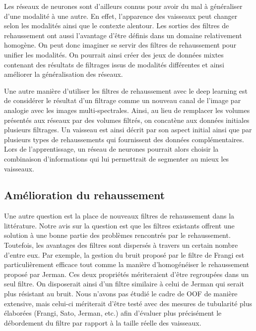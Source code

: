 Les réseaux de neurones sont d'ailleurs connus pour avoir du mal à généraliser d'une modalité à une autre. En effet, l'apparence des vaisseaux peut changer selon les modalités ainsi que le contexte alentour. Les sorties des filtres de rehaussement ont aussi l'avantage d'être définis dans un domaine relativement homogène. On peut donc imaginer se servir des filtres de rehaussement pour unifier les modalités. On pourrait ainsi créer des jeux de données mixtes contenant des résultats de filtrages issus de modalités différentes et ainsi améliorer la généralisation des réseaux.

Une autre manière d'utiliser les filtres de rehaussement avec le deep learning est de considérer le résultat d'un filtrage comme un nouveau canal de l’image par analogie avec les images multi-spectrales. Ainsi, au lieu de remplacer les volumes présentés aux réseaux par des volumes filtrés, on concatène aux données initiales plusieurs filtrages. Un vaisseau est ainsi décrit par son aspect initial ainsi que par plusieurs types de rehaussements qui fournissent des données complémentaires. Lors de l'apprentissage, un réseau de neurones pourrait alors choisir la combinaison d'informations qui lui permettrait de segmenter au mieux les vaisseaux. 

\subsection{Amélioration du rehaussement}

Une autre question est la place de nouveaux filtres de rehaussement dans la littérature. Notre avis sur la question est que les filtres existants offrent une solution à une bonne partie des problèmes rencontrés par le rehaussement. Toutefois, les avantages des filtres sont dispersés à travers un certain nombre d'entre eux. Par exemple, la gestion du bruit proposé par le filtre de Frangi est particulièrement efficace tout comme la manière d'homogénéiser le rehaussement proposé par Jerman. Ces deux propriétés mériteraient d'être regroupées dans un seul filtre. On disposerait ainsi d'un filtre similaire à celui de Jerman qui serait plus résistant au bruit. Nous n'avons pas étudié le cadre de OOF de manière extensive, mais celui-ci mériterait d'être testé avec des mesures de tubularité plus élaborées (Frangi, Sato, Jerman, etc.) afin d'évaluer plus précisément le débordement du filtre par rapport à la taille réelle des vaisseaux.

